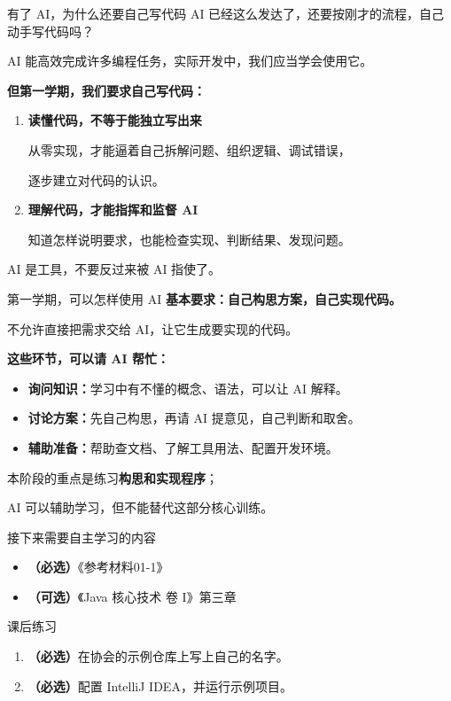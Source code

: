 \documentclass[aspectratio=169]{beamer}
\begin{document}
\begin{frame}{有了 AI，为什么还要自己写代码}
  AI 已经这么发达了，还要按刚才的流程，自己动手写代码吗？
  \par\medskip
  AI 能高效完成许多编程任务，实际开发中，我们应当学会使用它。
  \par\bigskip
  \textbf{但第一学期，我们要求自己写代码：}
  \medskip
  \begin{enumerate}
    \item \textbf{读懂代码，不等于能独立写出来}\par
      从零实现，才能逼着自己拆解问题、组织逻辑、调试错误，\par
      逐步建立对代码的认识。
    \item \textbf{理解代码，才能指挥和监督 AI}\par
      知道怎样说明要求，也能检查实现、判断结果、发现问题。
  \end{enumerate}
  \bigskip
  \alert{AI 是工具，不要反过来被 AI 指使了。}
\end{frame}

\begin{frame}{第一学期，可以怎样使用 AI}
  \textbf{基本要求：自己构思方案，自己实现代码。}
  \par\medskip
  \alert{不允许直接把需求交给 AI，让它生成要实现的代码。}
  \par\bigskip
  \textbf{这些环节，可以请 AI 帮忙：}
  \medskip
  \begin{itemize}
    \item \textbf{询问知识：}学习中有不懂的概念、语法，可以让 AI 解释。
    \item \textbf{讨论方案：}先自己构思，再请 AI 提意见，自己判断和取舍。
    \item \textbf{辅助准备：}帮助查文档、了解工具用法、配置开发环境。
  \end{itemize}
  \bigskip
  本阶段的重点是练习\textbf{构思和实现程序}；\par
  AI 可以辅助学习，但不能替代这部分核心训练。
\end{frame}

\begin{frame}{接下来需要自主学习的内容}
  \begin{itemize}
    \item \textbf{（必选）}《参考材料01-1》
      \bigskip
    \item \textbf{（可选）}《Java 核心技术 卷 I》第三章
  \end{itemize}
\end{frame}

\begin{frame}{课后练习}
  \begin{enumerate}
    \item \textbf{（必选）}在协会的示例仓库上写上自己的名字。
      \bigskip
    \item \textbf{（必选）}配置 IntelliJ IDEA，并运行示例项目。
  \end{enumerate}
\end{frame}
\end{document}
